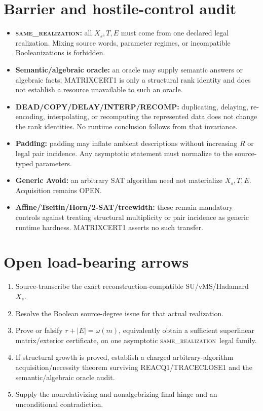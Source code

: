 \documentclass[11pt]{article}
\newcommand{\same}{\textsc{same\_realization}}
\begin{document}
\section*{Barrier and hostile-control audit}
\begin{itemize}
\item \textbf{\same:} all \(X_s,T,E\) must come from one declared legal realization. Mixing source words, parameter regimes, or incompatible Booleanizations is forbidden.
\item \textbf{Semantic/algebraic oracle:} an oracle may supply semantic answers or algebraic facts; MATRIXCERT1 is only a structural rank identity and does not establish a resource unavailable to such an oracle.
\item \textbf{DEAD/COPY/DELAY/INTERP/RECOMP:} duplicating, delaying, re-encoding, interpolating, or recomputing the represented data does not change the rank identities. No runtime conclusion follows from that invariance.
\item \textbf{Padding:} padding may inflate ambient descriptions without increasing \(R\) or legal pair incidence. Any asymptotic statement must normalize to the source-typed parameters.
\item \textbf{Generic Avoid:} an arbitrary SAT algorithm need not materialize \(X_s,T,E\). Acquisition remains OPEN.
\item \textbf{Affine/Tseitin/Horn/2-SAT/treewidth:} these remain mandatory controls against treating structural multiplicity or pair incidence as generic runtime hardness. MATRIXCERT1 asserts no such transfer.
\end{itemize}

\section*{Open load-bearing arrows}
\begin{enumerate}
\item Source-transcribe the exact reconstruction-compatible SU/vMS/Hadamard \(X_s\).
\item Resolve the Boolean source-degree issue for that actual realization.
\item Prove or falsify \(r+|E|=\omega(m)\), equivalently obtain a sufficient superlinear matrix/exterior certificate, on one asymptotic \same\ legal family.
\item If structural growth is proved, establish a charged arbitrary-algorithm acquisition/necessity theorem surviving REACQ1/TRACECLOSE1 and the semantic/algebraic oracle audit.
\item Supply the nonrelativizing and nonalgebrizing final hinge and an unconditional contradiction.
\end{enumerate}
\end{document}
